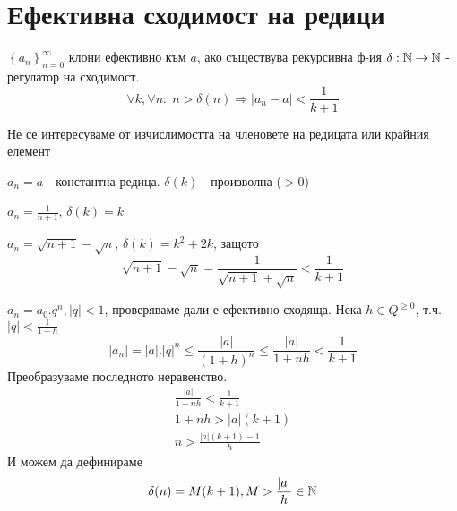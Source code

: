 \section{Ефективна сходимост на редици}
\begin{definition}
    $\left\{a_n\right\}_{n=0}^\infty$ клони ефективно към $a$, ако съществува рекурсивна ф-ия $\delta : {\mathbb{N}} \to {\mathbb{N}}$ - регулатор на сходимост.
    \begin{equation*}
        \forall k, \forall n:\; n > \delta(n) \Rightarrow |a_n - a| < \frac{1}{k+1}
    \end{equation*}
\end{definition}
\begin{remark}
    Не се интересуваме от изчислимостта на членовете на редицата или крайния елемент
\end{remark}
\begin{example}
    $a_n = a$ - константна редица. $\delta(k)$ - произволна ($> 0$)
\end{example}
\begin{example}
    $a_n = \frac{1}{n+1}$, $\delta(k) = k$
\end{example}
\begin{example}
    $a_n = \sqrt{n+1} - \sqrt{n}$, $\delta(k) = k^2 + 2k$, защото
    \begin{equation*}
        \sqrt{n+1} - \sqrt{n} = \frac{1}{\sqrt{n+1} + \sqrt{n}} < \frac{1}{k+1}
    \end{equation*}
\end{example}
\begin{example}
    $a_n = a_0.q^n, |q| < 1$, проверяваме дали е ефективно сходяща. Нека $h \in Q^{\geq 0}$, т.ч. $|q| < \frac{1}{1+h}$
    \begin{equation*}
        |a_n| = |a|.|q|^n \leq \frac{|a|}{(1+h)^n} \leq \frac{|a|}{1+nh} < \frac{1}{k+1}
    \end{equation*}
    Преобразуваме последното неравенство.
    \begin{equation*}
        \begin{split}
            \frac{|a|}{1+nh} < \frac{1}{k+1}\\
            1+nh > |a|(k+1)\\
            n > \frac{|a|(k+1) - 1}{h}
        \end{split}
    \end{equation*}
    И можем да дефинираме
    \begin{equation*}
        \delta(n) = M(k+1), M > \frac{|a|}{h} \in {\mathbb{N}}
    \end{equation*}
\end{example}
